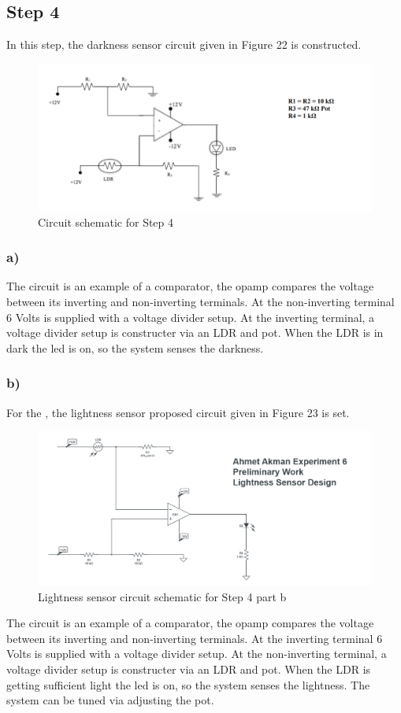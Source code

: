 \documentclass[letterpaper,12pt]{article}
\begin{document}
\subsection{Step 4}
In this step, the darkness sensor circuit given in Figure 22 is constructed.
\begin{figure}[H]
	\centering
   \includegraphics[width=1\textwidth]{darkness.png}
   \caption{Circuit schematic for Step 4}
\end{figure}
\subsubsection{a)}
The circuit is an example of a comparator, the opamp compares the voltage between its inverting and non-inverting terminals. At the non-inverting terminal 6 Volts is supplied with a voltage divider setup. At the inverting terminal, a voltage divider setup is constructer via an LDR and pot. When the LDR is in dark the led is on, so the system senses the darkness.
\subsubsection{b)}
For the , the lightness sensor proposed circuit given in Figure 23 is set. 
\begin{figure}[H]
	\centering
   \includegraphics[width=1\textwidth]{lightness.png}
   \caption{Lightness sensor circuit schematic for Step 4 part b}
\end{figure}
The circuit is an example of a comparator, the opamp compares the voltage between its inverting and non-inverting terminals. At the inverting terminal 6 Volts is supplied with a voltage divider setup. At the non-inverting terminal, a voltage divider setup is constructer via an LDR and pot. When the LDR is getting sufficient light the led is on, so the system senses the lightness. The system can be tuned via adjusting the pot.
\end{document}
